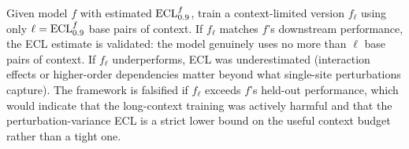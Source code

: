 Given model $f$ with estimated $\mathrm{ECL}^f_{0.9}$, train a context-limited version $f_\ell$ using only $\ell = \mathrm{ECL}^f_{0.9}$ base pairs of context. If $f_\ell$ matches $f$'s downstream performance, the ECL estimate is validated: the model genuinely uses no more than $\ell$ base pairs of context. If $f_\ell$ underperforms, ECL was underestimated (interaction effects or higher-order dependencies matter beyond what single-site perturbations capture). The framework is falsified if $f_\ell$ exceeds $f$'s held-out performance, which would indicate that the long-context training was actively harmful and that the perturbation-variance ECL is a strict lower bound on the useful context budget rather than a tight one.
